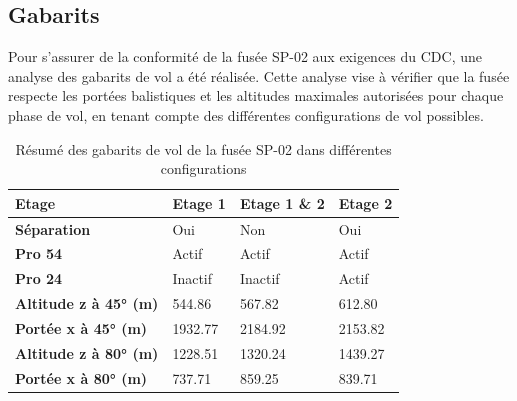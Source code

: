 \subsection{Gabarits}
\label{subsec:gabarits}

Pour s'assurer de la conformité de la fusée SP-02 aux exigences du \acrshort{CDC}, une analyse des gabarits de vol a été
réalisée. Cette analyse vise à vérifier que la fusée respecte les portées balistiques et les altitudes maximales autorisées pour
chaque phase de vol, en tenant compte des différentes configurations de vol possibles.\\

\begin{table}[h!]
    \centering
    \begin{tabular}{|l|l|l|l|}
        \hline
        \textbf{Etage} & \textbf{Etage 1} & \textbf{Etage 1 \& 2} & \textbf{Etage 2} \\
        \hline
        \textbf{Séparation} & Oui & Non & Oui \\
        \hline
        \textbf{Pro 54} & Actif & Actif & Actif \\
        \hline
        \textbf{Pro 24} & Inactif & Inactif & Actif \\
        \hline
        \textbf{Altitude z à 45° (m)} & 544.86 & 567.82 & 612.80 \\
        \hline
        \textbf{Portée x à 45° (m)} & 1932.77 & 2184.92 & 2153.82 \\
        \hline
        \textbf{Altitude z à 80° (m)} & 1228.51 & 1320.24 & 1439.27 \\
        \hline
        \textbf{Portée x à 80° (m)} & 737.71 & 859.25 & 839.71 \\
        \hline        
    \end{tabular}
    \caption{Résumé des gabarits de vol de la fusée SP-02 dans différentes configurations}
    \label{tab:gabarits_vol}
\end{table}
